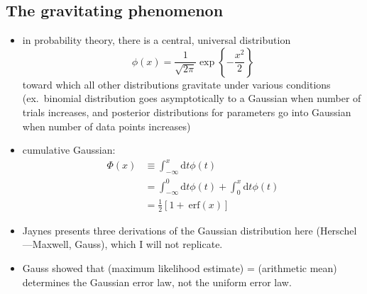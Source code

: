 \documentclass[../jaynes_prob_theory_notes.tex]{subfiles}
\begin{document}
        \subsection{The gravitating phenomenon}
            \begin{itemize}
                \item in probability theory, there is a central, universal distribution 
                    \begin{equation}
                        \label{gauss}
                        {\phi}(x) = \frac{1}{\sqrt{2\pi}} \exp \left \{ -\frac{x^2}{2} \right \}
                    \end{equation}
                    toward which all other distributions gravitate under various conditions (ex.\ binomial distribution goes asymptotically to a Gaussian when number of trials increases, and posterior distributions for parameters go into Gaussian when number of data points increases)
                \item cumulative Gaussian:
                    \begin{align*}
                        {\Phi}(x) &\equiv \int^{x}_{-\infty} \mathrm{d}t {\phi}(t) \\
                                 &= \int^{0}_{-\infty} \mathrm{d}t {\phi}(t) + \int^{x}_{0} \mathrm{d}t {\phi}(t) \\
                                  &= \frac{1}{2}[1 +~\mathrm{erf}(x)]
                    \end{align*}
                \item Jaynes presents three derivations of the Gaussian distribution here (Herschel---Maxwell, Gauss), which I will not replicate.
                \item Gauss showed that (maximum likelihood estimate) = (arithmetic mean) determines the Gaussian error law, not the uniform error law.
            \end{itemize}
\end{document}
